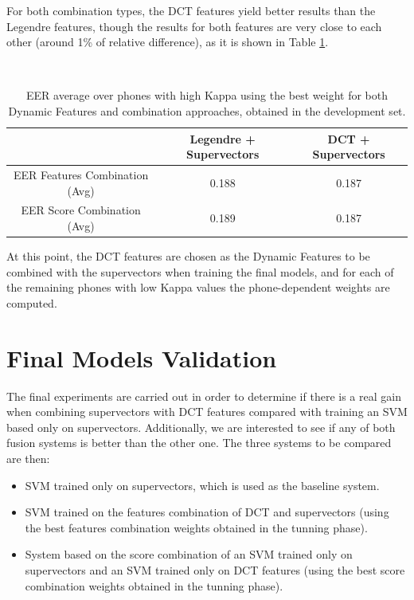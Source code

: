 For both combination types, the DCT features yield better results than the Legendre features,
though the results for both features are very close to each other (around 1\% of relative
difference), as it is shown in Table \ref{table:legendreVsDCTCombinations}.

~

\begin{table}[h]
	\renewcommand{\arraystretch}{1.5}
	\begin{center}
	    \begin{tabular}{ | c | c | c | }
	    \hline
	    & Legendre + Supervectors & DCT + Supervectors \\ \hline
	    EER Features Combination (Avg) & 0.188 & 0.187 \\ \hline
	    EER Score Combination (Avg) & 0.189  & 0.187 \\ \hline
	    \end{tabular}
	    \caption{EER average over phones with high Kappa using the best weight for
	    both Dynamic Features and combination approaches, obtained in the development set.}
	    \label{table:legendreVsDCTCombinations}
	\end{center}
\end{table}

At this point, the DCT features are chosen as the Dynamic Features to be combined with the
supervectors when training the final models, and for each of the remaining phones with
low Kappa values the phone-dependent weights are computed.

\section{Final Models Validation} \label{subsection:modelValidation}

The final experiments are carried out in order
to determine if there is a real gain when combining
supervectors with DCT features compared with training an SVM based only on supervectors.
Additionally, we are interested to see if any of both fusion systems is better
than the other one. The three systems to be compared are then:

\begin{itemize}
	\item SVM trained only on supervectors, which is used as the baseline system.
	\item SVM trained on the features combination of DCT and supervectors (using the best features combination weights obtained in the tunning phase).
	\item System based on the score combination of an SVM trained
	only on supervectors and an SVM trained
	only on DCT features (using the best score combination weights obtained in the tunning phase).
\end{itemize}


